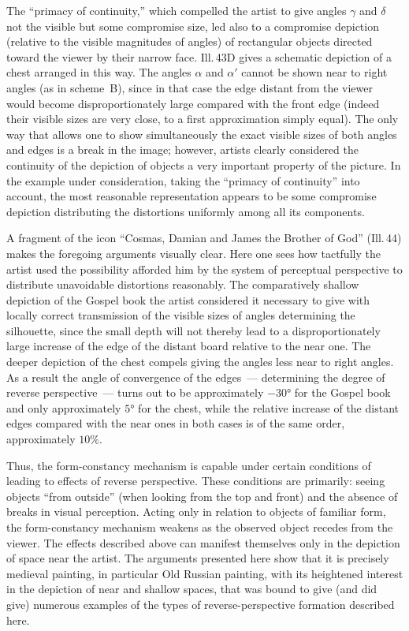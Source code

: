 The ``primacy of continuity,'' which compelled the artist to give angles $\gamma$ and
$\delta$ not the visible but some compromise size, led also to a compromise depiction
(relative to the visible magnitudes of angles) of rectangular objects directed toward
the viewer by their narrow face.  Ill.\,43D gives a schematic depiction of a chest
arranged in this way.  The angles $\alpha$ and $\alpha'$ cannot be shown near to
right angles (as in scheme~B), since in that case the edge distant from the viewer
would become disproportionately large compared with the front edge (indeed their
visible sizes are very close, to a first approximation simply equal).  The only way
that allows one to show simultaneously the exact visible sizes of both angles and
edges is a break in the image; however, artists clearly considered the continuity of
the depiction of objects a very important property of the picture.  In the example
under consideration, taking the ``primacy of continuity'' into account, the most
reasonable representation appears to be some compromise depiction distributing the
distortions uniformly among all its components.


A fragment of the icon ``Cosmas, Damian and James the Brother of God'' (Ill.\,44)
makes the foregoing arguments visually clear.  Here one sees how tactfully the artist
used the possibility afforded him by the system of perceptual perspective to
distribute unavoidable distortions reasonably.  The comparatively shallow depiction
of the Gospel book the artist considered it necessary to give with locally correct
transmission of the visible sizes of angles determining the silhouette, since the
small depth will not thereby lead to a disproportionately large increase of the edge
of the distant board relative to the near one.  The deeper depiction of the chest
compels giving the angles less near to right angles.  As a result the angle of
convergence of the edges~--- determining the degree of reverse perspective~--- turns
out to be approximately $-30°$ for the Gospel book and only approximately $5°$ for
the chest, while the relative increase of the distant edges compared with the near
ones in both cases is of the same order, approximately $10\%$.


Thus, the form-constancy mechanism is capable under certain conditions of leading to
effects of reverse perspective.  These conditions are primarily: seeing objects
``from outside'' (when looking from the top and front) and the absence of breaks in
visual perception.  Acting only in relation to objects of familiar form, the
form-constancy mechanism weakens as the observed object recedes from the viewer.  The
effects described above can manifest themselves only in the depiction of space near
the artist.  The arguments presented here show that it is precisely medieval painting,
in particular Old Russian painting, with its heightened interest in the depiction of
near and shallow spaces, that was bound to give (and did give) numerous examples of
the types of reverse-perspective formation described here.

